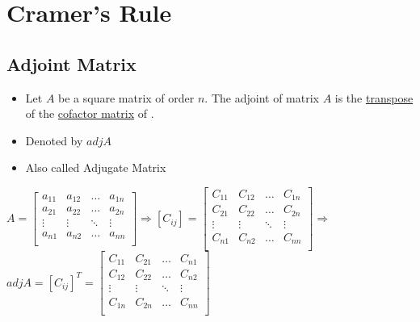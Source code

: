 \documentclass[a4paper,12pt]{article}
\begin{document}
\section*{Cramer's Rule}

\subsection*{Adjoint Matrix}
\begin{itemize}
  \item Let \(A\) be a square matrix of order \(n\). The adjoint of matrix \(A\) is the \underline{transpose} of the \underline{cofactor matrix} of \(\).
  \item Denoted by \(adj A\)
  \item Also called Adjugate Matrix
\end{itemize}
\begin{center}
  \(A=\begin{bmatrix}
    a_{11} & a_{12} & \dots  & a_{1n} \\
    a_{21} & a_{22} & \dots  & a_{2n} \\
    \vdots & \vdots & \ddots & \vdots \\
    a_{n1} & a_{n2} & \dots  & a_{nn} \\
  \end{bmatrix} \Rightarrow [C_{ij}]=\begin{bmatrix}
    C_{11} & C_{12} & \dots  & C_{1n} \\
    C_{21} & C_{22} & \dots  & C_{2n} \\
    \vdots & \vdots & \ddots & \vdots \\
    C_{n1} & C_{n2} & \dots  & C_{nn} \\
  \end{bmatrix} \Rightarrow \) \\
  \(adj A=[C_{ij}]^T=\begin{bmatrix}
    C_{11} & C_{21} & \dots  & C_{n1} \\
    C_{12} & C_{22} & \dots  & C_{n2} \\
    \vdots & \vdots & \ddots & \vdots \\
    C_{1n} & C_{2n} & \dots  & C_{nn} \\
  \end{bmatrix}\)
\end{center}
\end{document}
